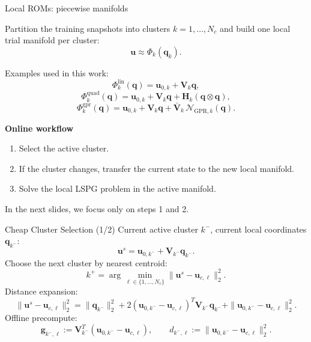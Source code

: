 \documentclass{beamer}
\begin{document}
\begin{frame}{Local ROMs: piecewise manifolds}
\small

Partition the training snapshots into clusters $k=1,\dots,N_c$ and build one local trial manifold per cluster:
\[
\mathbf u \approx \Phi_k(\mathbf q_k).
\]

Examples used in this work:
\[
\Phi_k^{\mathrm{lin}}(\mathbf q)
=
\mathbf u_{0,k}+\mathbf V_k\mathbf q,
\]
\[
\Phi_k^{\mathrm{quad}}(\mathbf q)
=
\mathbf u_{0,k}+\mathbf V_k\mathbf q+\mathbf H_k(\mathbf q\otimes\mathbf q),
\]
\[
\Phi_k^{\mathrm{gpr}}(\mathbf q)
=
\mathbf u_{0,k}+\mathbf V_k\mathbf q+\bar{\mathbf V}_k\,\mathcal N_{\mathrm{GPR},k}(\mathbf q).
\]

\vspace{0.3em}
\textbf{Online workflow}
\begin{enumerate}
    \item Select the active cluster.
    \item If the cluster changes, transfer the current state to the new local manifold.
    \item Solve the local LSPG problem in the active manifold.
\end{enumerate}

\vspace{0.3em}
In the next slides, we focus only on steps 1 and 2.

\end{frame}

\begin{frame}{Cheap Cluster Selection (1/2)}
\scriptsize
Current active cluster $k^-$, current local coordinates $\mathbf q_{k^-}$:
\[
\mathbf u^s=\mathbf u_{0,k^-}+\mathbf V_{k^-}\mathbf q_{k^-}.
\]
Choose the next cluster by nearest centroid:
\[
k^+=\arg\min_{\ell\in\{1,\dots,N_c\}}
\|\mathbf u^s-\mathbf u_{c,\ell}\|_2^2.
\]
Distance expansion:
\[
\|\mathbf u^s-\mathbf u_{c,\ell}\|_2^2
=
\|\mathbf q_{k^-}\|_2^2
+2(\mathbf u_{0,k^-}-\mathbf u_{c,\ell})^T\mathbf V_{k^-}\mathbf q_{k^-}
+\|\mathbf u_{0,k^-}-\mathbf u_{c,\ell}\|_2^2.
\]
Offline precompute:
\[
\mathbf g_{k^-,\ell}:=\mathbf V_{k^-}^T(\mathbf u_{0,k^-}-\mathbf u_{c,\ell}),
\qquad
d_{k^-,\ell}:=\|\mathbf u_{0,k^-}-\mathbf u_{c,\ell}\|_2^2.
\]
\end{frame}
\end{document}
